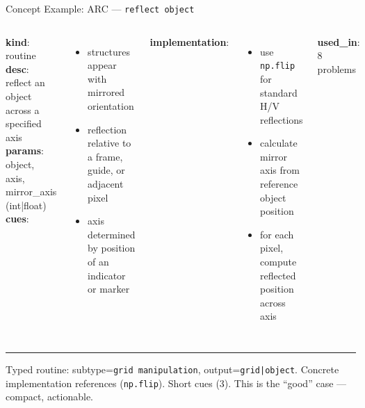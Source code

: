 \documentclass[10pt]{beamer}
\begin{document}
\begin{frame}{Concept Example: \textcolor{arcblue}{ARC} --- \texttt{reflect object}}
  \begin{columns}[T]
    {\scriptsize
    \textbf{kind}: routine\\
    \textbf{desc}: reflect an object across a specified axis\\
    \textbf{params}: object, axis, mirror\_axis (int|float)\\[0.3em]
    \textbf{cues}:
    \begin{itemize}\setlength\itemsep{0pt}
      \item structures appear with mirrored orientation
      \item reflection relative to a frame, guide, or adjacent pixel
      \item axis determined by position of an indicator or marker
    \end{itemize}
    }

    {\scriptsize
    \textbf{implementation}:
    \begin{itemize}\setlength\itemsep{0pt}
      \item use \texttt{np.flip} for standard H/V reflections
      \item calculate mirror axis from reference object position
      \item for each pixel, compute reflected position across axis
    \end{itemize}
    \vspace{0.3em}
    \textbf{used\_in}: 8 problems
    }
  \end{columns}

  \vspace{0.7em}
  \hrule
  \vspace{0.3em}
  {\footnotesize Typed routine: subtype=\texttt{grid manipulation}, output=\texttt{grid|object}. Concrete implementation references (\texttt{np.flip}). Short cues (3). This is the ``good'' case --- compact, actionable.}
\end{frame}
\end{document}
